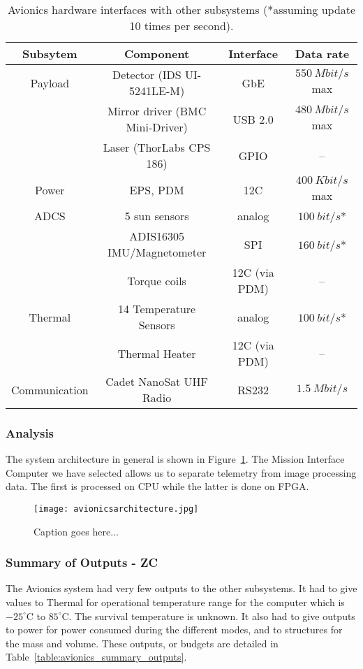 \documentclass[12pt]{article}
\begin{document}
\begin{table}[ht]\label{table:avionics_interfaces}
\caption{Avionics hardware interfaces with other subsystems (*assuming update 10 times per second).}
\begin{center}
    \begin{tabular}{| c | c | c | c |} \hline
    	Subsytem & Component & Interface & Data rate \\ \hline \hline
    Payload & Detector (IDS UI-5241LE-M) & GbE & $550\ Mbit/s$ max  \\
     & Mirror driver (BMC Mini-Driver) & USB 2.0 & $480\ Mbit/s$ max \\
     & Laser (ThorLabs CPS 186) & GPIO & -- \\ \hline
    Power & EPS, PDM & 12C & $400\ Kbit/s$ max \\ \hline
    ADCS & 5 sun sensors & analog & $100\ bit/s$* \\
     & ADIS16305 IMU/Magnetometer & SPI & $160\ bit/s$* \\
     & Torque coils & 12C (via PDM) & -- \\ \hline
    Thermal & 14 Temperature Sensors & analog & $100\ bit/s$* \\
     & Thermal Heater & 12C (via PDM) & -- \\ \hline
    Communication & Cadet NanoSat UHF Radio & RS232 & $1.5\ Mbit/s$ \\ \hline 
    \end{tabular}
\end{center}
\end{table}

			\subsubsection{Analysis}
The system architecture in general is shown in Figure~\ref{fig:avionics_architecture}. The Mission Interface Computer we have selected allows us to separate telemetry from image processing data. The first is processed on CPU while the latter is done on FPGA.

\begin{figure}[ht]\label{fig:avionics_architecture}
\centering
  \texttt{[image: avionicsarchitecture.jpg]}
\caption{Caption goes here...}
\end{figure}

			\subsubsection{Summary of Outputs - ZC}
The Avionics system had very few outputs to the other subsystems. It had to give values to Thermal for operational temperature range for the computer which is $-25^\circ$C to $85^\circ$C. The survival temperature is unknown. It also had to give outputs to power for power consumed during the different modes, and to structures for the mass and volume. These outputs, or budgets are detailed in Table~\ref{table:avionics_summary_outputs}.
\end{document}
